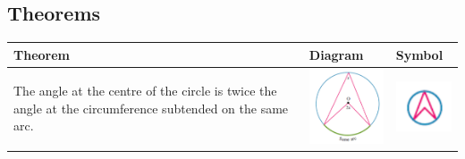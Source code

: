 \documentclass[a4paper,10pt]{report}
\begin{document}
\subsection{Theorems}
\begin{tabular}[center]{p{5cm}|p{3cm}|p{2cm}}
	Theorem                                                                                                  & Diagram                                       & Symbol                                               \\ \hline
	The angle at the centre of the circle is twice the angle at the circumference subtended on the same arc. & \includegraphics[width=3cm]{circle theorem 1} & \includegraphics[width=2cm]{circle theorem 1 symbol}
\end{tabular}
\end{document}

